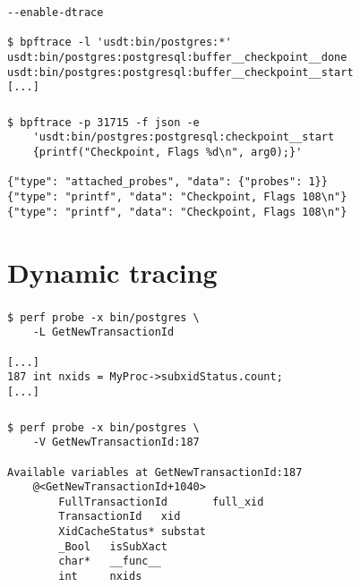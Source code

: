 \documentclass[usenames,dvipsnames, 18pt, compress, aspectratio=169]{beamer}
\begin{document}
\begin{frame}[fragile]{}
    \frametitle{}
    \begin{center}
        \begin{verbatim}
--enable-dtrace

$ bpftrace -l 'usdt:bin/postgres:*'
usdt:bin/postgres:postgresql:buffer__checkpoint__done
usdt:bin/postgres:postgresql:buffer__checkpoint__start
[...]
        \end{verbatim}
    \end{center}
\end{frame}

\begin{frame}[fragile]{}
    \frametitle{}
    \begin{center}
        \begin{verbatim}
$ bpftrace -p 31715 -f json -e
    'usdt:bin/postgres:postgresql:checkpoint__start
    {printf("Checkpoint, Flags %d\n", arg0);}'

{"type": "attached_probes", "data": {"probes": 1}}
{"type": "printf", "data": "Checkpoint, Flags 108\n"}
{"type": "printf", "data": "Checkpoint, Flags 108\n"}
        \end{verbatim}
    \end{center}
\end{frame}

\section{Dynamic tracing}

\begin{frame}[fragile]{}
    \frametitle{}
    \begin{center}
        \begin{verbatim}
$ perf probe -x bin/postgres \
    -L GetNewTransactionId

[...]
187 int nxids = MyProc->subxidStatus.count;
[...]
        \end{verbatim}
    \end{center}
\end{frame}

\begin{frame}[fragile]{}
    \frametitle{}
    \begin{center}
        \begin{verbatim}
$ perf probe -x bin/postgres \
    -V GetNewTransactionId:187

Available variables at GetNewTransactionId:187
	@<GetNewTransactionId+1040>
		FullTransactionId       full_xid
		TransactionId   xid
		XidCacheStatus* substat
		_Bool   isSubXact
		char*   __func__
		int     nxids
        \end{verbatim}
    \end{center}
\end{frame}
\end{document}
